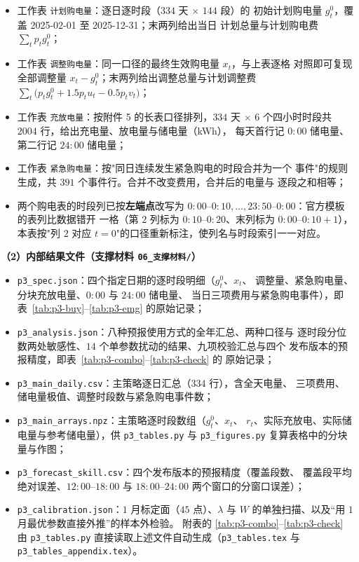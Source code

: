 \documentclass[withoutpreface,bwprint]{cumcmthesis}
\begin{document}
\begin{appendices}
\begin{itemize}
  \item 工作表 \texttt{计划购电量}：逐日逐时段（$334$ 天 $\times$ $144$ 段）的
        初始计划购电量 $g_t^0$，覆盖 2025-02-01 至 2025-12-31；末两列给出当日
        计划总量与计划购电费 $\sum_tp_tg_t^0$；
  \item 工作表 \texttt{调整购电量}：同一口径的最终生效购电量 $x_t$，与上表逐格
        对照即可复现全部调整量 $x_t-g_t^0$；末两列给出调整总量与计划调整费
        $\sum_t\big(p_tg_t^0+1.5p_tu_t-0.5p_tv_t\big)$；
  \item 工作表 \texttt{充放电量}：按附件 5 的长表口径排列，$334$ 天 $\times$
        $6$ 个四小时时段共 $2004$ 行，给出充电量、放电量与储电量（kWh），
        每天首行记 $0{:}00$ 储电量、第二行记 $24{:}00$ 储电量；
  \item 工作表 \texttt{紧急购电量}：按"同日连续发生紧急购电的时段合并为一个
        事件"的规则生成，共 $391$ 个事件行。合并不改变费用，合并后的电量与
        逐段之和相等；
  \item 两个购电表的时段列已按\textbf{左端点}改写为
        $0{:}00$--$0{:}10,\dots,23{:}50$--$0{:}00$：官方模板的表列比数据错开
        一格（第 $2$ 列标为 $0{:}10$--$0{:}20$、末列标为 $0{:}00$--$0{:}10{+}1$），
        本表按"列 $2$ 对应 $t=0$"的口径重新标注，使列名与时段索引一一对应。
\end{itemize}

\textbf{（2）内部结果文件（支撑材料 \texttt{06\_支撑材料/}）}

\begin{itemize}
  \item \texttt{p3\_spec.json}：四个指定日期的逐时段明细（$g_t^0$、$x_t$、
        调整量、紧急购电量、分块充放电量、$0{:}00$ 与 $24{:}00$ 储电量、
        当日三项费用与紧急购电事件），即表~\ref{tab:p3-buy}--\ref{tab:p3-emg}
        的原始记录；
  \item \texttt{p3\_analysis.json}：八种预报使用方式的全年汇总、两种口径与
        逐时段分位数两处敏感性、$14$ 个单参数扰动的结果、九项校验汇总与四个
        发布版本的预报精度，即表~\ref{tab:p3-combo}--\ref{tab:p3-check} 的
        原始记录；
  \item \texttt{p3\_main\_daily.csv}：主策略逐日汇总（$334$ 行），含全天电量、
        三项费用、储电量极值、调整时段数与紧急购电事件数；
  \item \texttt{p3\_main\_arrays.npz}：主策略逐时段数组（$g_t^0$、$x_t$、
        $r_t$、实际充放电、实际储电量与参考储电量），供 \texttt{p3\_tables.py}
        与 \texttt{p3\_figures.py} 复算表格中的分块量与作图；
  \item \texttt{p3\_forecast\_skill.csv}：四个发布版本的预报精度（覆盖段数、
        覆盖段平均绝对误差、$12{:}00$--$18{:}00$ 与 $18{:}00$--$24{:}00$
        两个窗口的分窗口误差）；
  \item \texttt{p3\_calibration.json}：$1$ 月标定面（$45$ 点）、$\lambda$ 与
        $W$ 的单独扫描、以及“用 $1$ 月最优参数直接外推”的样本外检验。
        附表的 \ref{tab:p3-combo}--\ref{tab:p3-check} 由 \texttt{p3\_tables.py}
        直接读取上述文件自动生成（\texttt{p3\_tables.tex} 与
        \texttt{p3\_tables\_appendix.tex}）。
\end{itemize}




\end{appendices}
\end{document}
